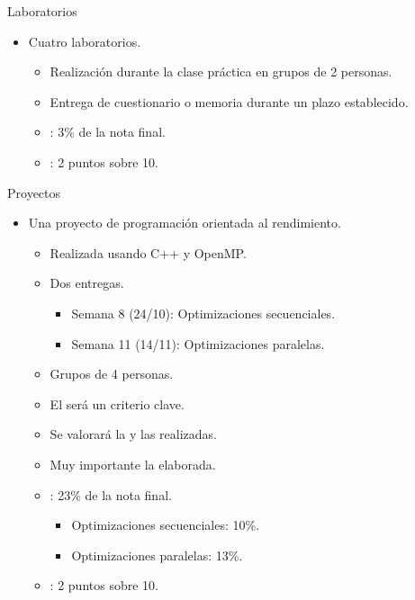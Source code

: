 \begin{frame}[t]{Laboratorios}
\begin{itemize}
  \item Cuatro laboratorios.
    \begin{itemize}
      \item Realización durante la clase práctica en grupos de 2 personas.
      \item Entrega de cuestionario o memoria durante un plazo
            establecido.
      \item {}: 3\% de la nota final.
      \item {}: 2 puntos sobre 10.
    \end{itemize}
\end{itemize}
\end{frame}

\begin{frame}[t]{Proyectos}
\begin{itemize}
  \item Una proyecto de programación orientada al rendimiento.
    \begin{itemize}
      \item Realizada usando C++ y OpenMP.
      \item Dos entregas.
        \begin{itemize}
          \item Semana 8 (24/10): Optimizaciones secuenciales.
          \item Semana 11 (14/11): Optimizaciones paralelas.
        \end{itemize}
      \item Grupos de 4 personas.
      \item El  será un criterio clave.
      \item Se valorará la  y las 
             realizadas.
      \item Muy importante la  elaborada.
      \item {}: 23\% de la nota final.
        \begin{itemize}
          \item Optimizaciones secuenciales: 10\%.
          \item Optimizaciones paralelas: 13\%.
        \end{itemize}
      \item {}: 2 puntos sobre 10.
    \end{itemize}
\end{itemize}
\end{frame}

